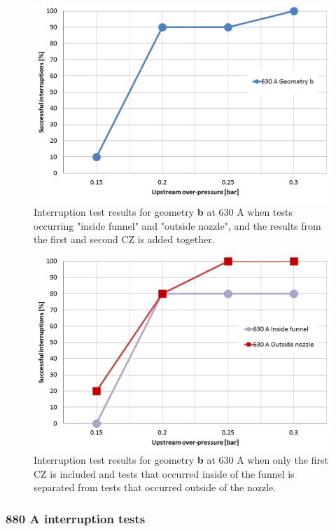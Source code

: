 \documentclass[10pt,b5paper,twoside]{article}
\begin{document}
\begin{figure}[H]
\centering
\includegraphics[scale=0.45]{Bilder/Results/geoB630amp.PNG}
\caption{Interruption test results for geometry \textbf{b} at 630 A when tests occurring "inside funnel" and "outside nozzle", and the results from the first and second CZ is added together.} \label{fig:results630AgeoB}
\end{figure}

\begin{figure}[H]
\centering
\includegraphics[scale=0.45]{Bilder/Results/geoB630ampcomp.PNG}
\caption{Interruption test results for geometry \textbf{b} at 630 A when only the first CZ is included and tests that occurred inside of the funnel is separated from tests that occurred outside of the nozzle.} \label{fig:results630AgeoBcomp}
\end{figure}

\subsubsection*{880 A interruption tests}
\end{document}
